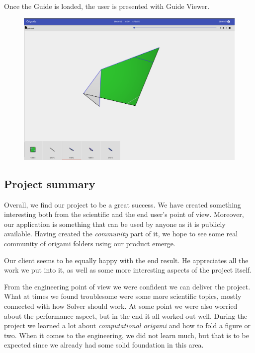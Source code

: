 Once the Guide is loaded, the user is presented with Guide Viewer.

\begin{figure}[H]
  	\centering
    \includegraphics[width=\textwidth]{assets/5-folderView.png}
\end{figure}


\subsection{Project summary}

Overall, we find our project to be a great success.
We have created something interesting both from the scientific and the end user's
point of view. Moreover, our application is something that can be used
by anyone as it is publicly available. Having created the \textit{community}
part of it, we hope to see some real community of origami folders using our product emerge.
\smallskip

Our client seems to be equally happy with the end result.
He appreciates all the work we put into it, 
as well as some more interesting aspects of the project itself.
\smallskip

From the engineering point of view we were confident we can deliver the project.
What at times we found troublesome were some more scientific topics, mostly
connected with how Solver should work.
At some point we were also worried about the performance aspect, but in the end it all worked out well.
During the project we learned a lot about \textit{computational origami} and how to fold a figure or two.
When it comes to the engineering, we did not learn much, but
that is to be expected since we already had some solid foundation in this area.
\smallskip


